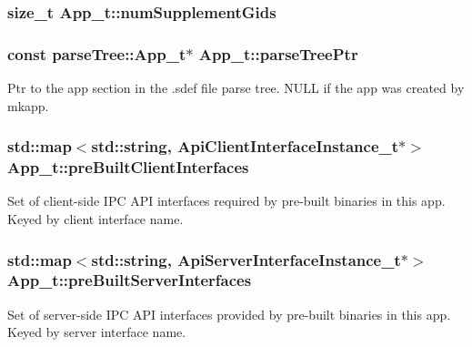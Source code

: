 \subsubsection[{\texorpdfstring{num\+Supplement\+Gids}{numSupplementGids}}]{\setlength{\rightskip}{0pt plus 5cm}size\+\_\+t App\+\_\+t\+::num\+Supplement\+Gids}\hypertarget{struct_app__t_a0411c713746b9d2f79f84b163c018dcc}{}\label{struct_app__t_a0411c713746b9d2f79f84b163c018dcc}
\subsubsection[{\texorpdfstring{parse\+Tree\+Ptr}{parseTreePtr}}]{\setlength{\rightskip}{0pt plus 5cm}const {\bf parse\+Tree\+::\+App\+\_\+t}$\ast$ App\+\_\+t\+::parse\+Tree\+Ptr}\hypertarget{struct_app__t_a6ec599361aa81d053e454bcc9081ca1c}{}\label{struct_app__t_a6ec599361aa81d053e454bcc9081ca1c}
Ptr to the app section in the .sdef file parse tree. N\+U\+LL if the app was created by mkapp. 
\subsubsection[{\texorpdfstring{pre\+Built\+Client\+Interfaces}{preBuiltClientInterfaces}}]{\setlength{\rightskip}{0pt plus 5cm}std\+::map$<$std\+::string, {\bf Api\+Client\+Interface\+Instance\+\_\+t}$\ast$$>$ App\+\_\+t\+::pre\+Built\+Client\+Interfaces}\hypertarget{struct_app__t_a6579c151e9b59a943d48b5b6635a5af0}{}\label{struct_app__t_a6579c151e9b59a943d48b5b6635a5af0}
Set of client-\/side I\+PC A\+PI interfaces required by pre-\/built binaries in this app. Keyed by client interface name. 
\subsubsection[{\texorpdfstring{pre\+Built\+Server\+Interfaces}{preBuiltServerInterfaces}}]{\setlength{\rightskip}{0pt plus 5cm}std\+::map$<$std\+::string, {\bf Api\+Server\+Interface\+Instance\+\_\+t}$\ast$$>$ App\+\_\+t\+::pre\+Built\+Server\+Interfaces}\hypertarget{struct_app__t_a0323e0de984089357e9b7815d6a973e2}{}\label{struct_app__t_a0323e0de984089357e9b7815d6a973e2}
Set of server-\/side I\+PC A\+PI interfaces provided by pre-\/built binaries in this app. Keyed by server interface name. 
